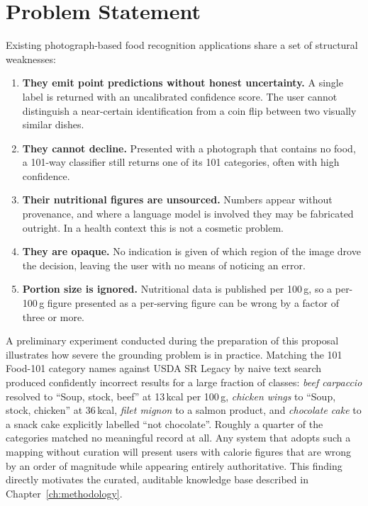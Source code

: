 \documentclass[12pt,a4paper,oneside]{report}
\begin{document}
\chapter{Problem Statement}

Existing photograph-based food recognition applications share a set of
structural weaknesses:

\begin{enumerate}
  \item \textbf{They emit point predictions without honest uncertainty.} A
  single label is returned with an uncalibrated confidence score. The user
  cannot distinguish a near-certain identification from a coin flip between two
  visually similar dishes.
  \item \textbf{They cannot decline.} Presented with a photograph that contains
  no food, a 101-way classifier still returns one of its 101 categories, often
  with high confidence.
  \item \textbf{Their nutritional figures are unsourced.} Numbers appear without
  provenance, and where a language model is involved they may be fabricated
  outright. In a health context this is not a cosmetic problem.
  \item \textbf{They are opaque.} No indication is given of which region of the
  image drove the decision, leaving the user with no means of noticing an error.
  \item \textbf{Portion size is ignored.} Nutritional data is published per
  100\,g, so a per-100\,g figure presented as a per-serving figure can be wrong
  by a factor of three or more.
\end{enumerate}

A preliminary experiment conducted during the preparation of this proposal
illustrates how severe the grounding problem is in practice. Matching the 101
Food-101 category names against USDA SR Legacy by naive text search produced
confidently incorrect results for a large fraction of classes: \textit{beef
carpaccio} resolved to ``Soup, stock, beef'' at 13\,kcal per 100\,g,
\textit{chicken wings} to ``Soup, stock, chicken'' at 36\,kcal, \textit{filet
mignon} to a salmon product, and \textit{chocolate cake} to a snack cake
explicitly labelled ``not chocolate''. Roughly a quarter of the categories
matched no meaningful record at all. Any system that adopts such a mapping
without curation will present users with calorie figures that are wrong by an
order of magnitude while appearing entirely authoritative. This finding directly
motivates the curated, auditable knowledge base described in
Chapter~\ref{ch:methodology}.
\end{document}
